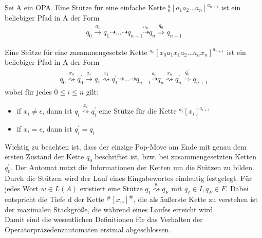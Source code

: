 \begin{definition}[Stützen]
Sei A ein OPA. Eine Stütze für eine einfache Kette $^a_0 \left[ a_1a_2...a_n\right]^{a_{n+1}}$ ist ein beliebiger Pfad in A der Form 
\begin{eqnarray}
q_0  \stackrel{a_1}{\rightarrow} q_1 \dashrightarrow ... \dashrightarrow q_{n-1} \stackrel{a_n}{\dashrightarrow} q_n \stackrel {q_0} {\Rightarrow} q_{n+1}
\end{eqnarray}

Eine Stütze für eine zusammengesetzte Kette $^{a_0}\left[x_0a_1x_1a_2...a_nx_n\right]^{a_{n+1}}$ ist ein beliebiger Pfad in A der Form
\begin{eqnarray}
q_0 \stackrel{x_0}{\rightsquigarrow} q_0^{\prime} \stackrel{a_1}{\rightarrow} q_1\stackrel{x_1}{\rightsquigarrow} q_1^{\prime} \dashrightarrow ... \dashrightarrow q_{n-1} \stackrel{a_n}{\dashrightarrow} q_n \stackrel{x_n}{\rightsquigarrow} q_n^{\prime} \stackrel {q_0^{\prime}} {\Rightarrow} q_{n+1}
\end{eqnarray}
wobei für jedes $0\leq i \leq n$ gilt: 
\begin{itemize}
\item if $x_i \neq \epsilon$, dann ist $q_i \stackrel{x_i}{\rightsquigarrow} q_i^{\prime}$ eine Stütze für die Kette $^{a_i}\left[x_i\right]^{a_{i+1}}$
\item if $x_i = \epsilon$, dann ist $q_i^{\prime}=q_i$
\end{itemize}
\end{definition}

Wichtig zu beachten ist, dass der einzige Pop-Move am Ende mit genau dem ersten Zustand der Kette $q_0$ beschriftet ist, bzw. bei zusammengesetzten Ketten $q_0^{\prime}.$ Der Automat nutzt die Informationen der Ketten um die Stützen zu bilden. Durch die Stützen wird der Lauf eines Eingabewortes eindeutig festgelegt. Für jedes Wort $w \in L(A)$ existiert eine Stütze $q_I  \stackrel{w}{\rightsquigarrow} q_F$ mit $q_I \in I, q_F \in F$.  Dabei entspricht die Tiefe d der Kette $^\#\left[x_w\right]^\#$, die als äußerste Kette zu verstehen ist der maximalen Stackgröße, die während eines Laufes erreicht wird.\\
Damit sind die wesentlichen Definitionen für das Verhalten der Operatorpräzedenzautomaten erstmal abgeschlossen.
